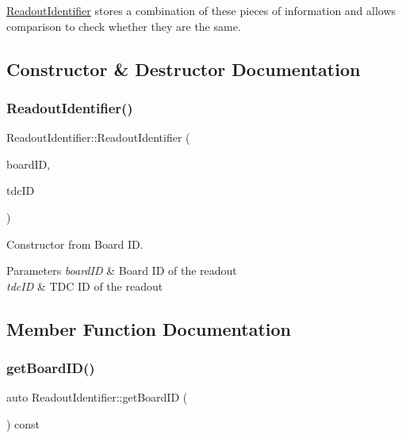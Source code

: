 \hyperlink{class_readout_identifier}{Readout\+Identifier} stores a combination of these pieces of information and allows comparison to check whether they are the same. 

\subsection{Constructor \& Destructor Documentation}
\mbox{\label{class_readout_identifier_a6dbfa3a186abade180d962aa22c81e71}} 
\subsubsection{\texorpdfstring{Readout\+Identifier()}{ReadoutIdentifier()}}
{\footnotesize\ttfamily Readout\+Identifier\+::\+Readout\+Identifier (\begin{DoxyParamCaption}\item[{const \hyperlink{class_board_identifier}{Board\+Identifier} \&}]{board\+ID,  }\item[{const unsigned int}]{tdc\+ID }\end{DoxyParamCaption})}



Constructor from Board ID. 


\begin{DoxyParams}{Parameters}
{\em board\+ID} & Board ID of the readout \\
\hline
{\em tdc\+ID} & T\+DC ID of the readout \\
\hline
\end{DoxyParams}


\subsection{Member Function Documentation}
\mbox{\label{class_readout_identifier_ad5a9727c8ed4bd02883f6d68d0fadac8}} 
\subsubsection{\texorpdfstring{get\+Board\+I\+D()}{getBoardID()}}
{\footnotesize\ttfamily auto Readout\+Identifier\+::get\+Board\+ID (\begin{DoxyParamCaption}{ }\end{DoxyParamCaption}) const\hspace{0.3cm}{\ttfamily [inline]}}



